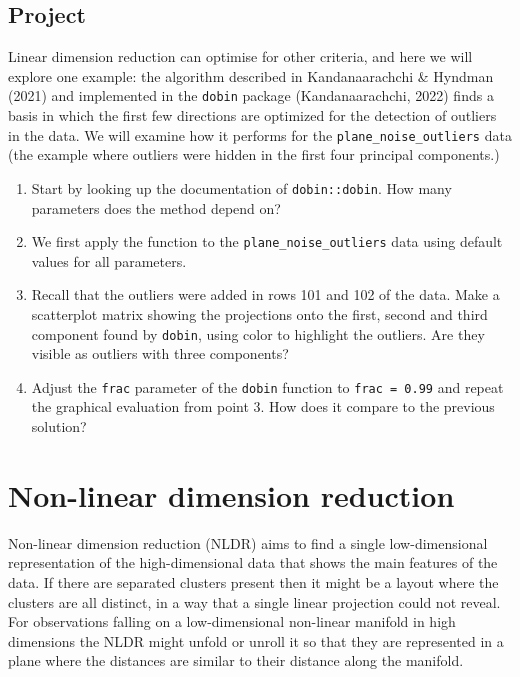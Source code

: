 \documentclass[
  letterpaper,
]{krantz}
\providecommand{\tightlist}{%
  \setlength{\itemsep}{0pt}\setlength{\parskip}{0pt}}
\begin{document}
\section*{Project}\label{project-1}


Linear dimension reduction can optimise for other criteria, and here we
will explore one example: the algorithm described in Kandanaarachchi \&
Hyndman (2021) and implemented in the \texttt{dobin} package
(Kandanaarachchi, 2022) finds a basis in which the first few directions
are optimized for the detection of outliers in the data. We will examine
how it performs for the \texttt{plane\_noise\_outliers} data (the
example where outliers were hidden in the first four principal
components.)

\begin{enumerate}
\def\labelenumi{\arabic{enumi}.}
\tightlist
\item
  Start by looking up the documentation of \texttt{dobin::dobin}. How
  many parameters does the method depend on?
\item
  We first apply the function to the \texttt{plane\_noise\_outliers}
  data using default values for all parameters.
\item
  Recall that the outliers were added in rows 101 and 102 of the data.
  Make a scatterplot matrix showing the projections onto the first,
  second and third component found by \texttt{dobin}, using color to
  highlight the outliers. Are they visible as outliers with three
  components?
\item
  Adjust the \texttt{frac} parameter of the \texttt{dobin} function to
  \texttt{frac\ =\ 0.99} and repeat the graphical evaluation from point
  3. How does it compare to the previous solution?
\end{enumerate}

 

\chapter{Non-linear dimension reduction}\label{sec-nldr}

Non-linear dimension reduction (NLDR) aims to find a single
low-dimensional representation of the high-dimensional data that shows
the main features of the data. If there are separated clusters present
then it might be a layout where the clusters are all distinct, in a way
that a single linear projection could not reveal. For observations
falling on a low-dimensional non-linear manifold in high dimensions the
NLDR might unfold or unroll it so that they are represented in a plane
where the distances are similar to their distance along the manifold.
\end{document}
